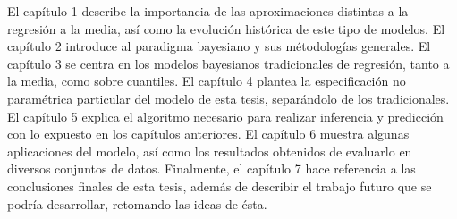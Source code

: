 \documentclass[letterpaper,onside,11pt,review,usenames,dvipsnames]{report}
\begin{document}
El cap\'itulo 1 describe la importancia de las aproximaciones distintas a la regresi\'on a la media, así como la evoluci\'on hist\'orica de este tipo de modelos. El cap\'itulo 2 introduce al paradigma bayesiano y sus m\'etodolog\'ias generales. El cap\'itulo 3 se centra en los modelos bayesianos tradicionales de regresi\'on, tanto a la media, como sobre cuantiles. El cap\'itulo 4 plantea la especificaci\'on no param\'etrica particular del modelo de esta tesis, separ\'andolo de los tradicionales. El cap\'itulo 5 explica el algoritmo necesario para realizar inferencia y predicci\'on con lo expuesto en los cap\'itulos anteriores. El cap\'itulo 6 muestra algunas aplicaciones del modelo, as\'i como los resultados obtenidos de evaluarlo en diversos conjuntos de datos. Finalmente, el cap\'itulo 7 hace referencia a las conclusiones finales de esta tesis, adem\'as de describir el trabajo futuro que se podr\'ia desarrollar, retomando las ideas de \'esta.




\renewcommand{\baselinestretch}{0.75}\normalsize
\tableofcontents
\renewcommand{\baselinestretch}{1.0}\normalsize
















\nocite{*} %

\appendix


\end{document}
